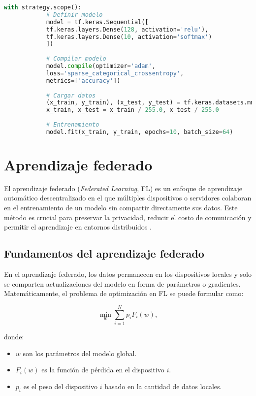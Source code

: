 \begin{itemize}
\begin{lstlisting}[language=Python, caption={Entrenamiento distribuido en TensorFlow}]
			with strategy.scope():
			# Definir modelo
			model = tf.keras.Sequential([
			tf.keras.layers.Dense(128, activation='relu'),
			tf.keras.layers.Dense(10, activation='softmax')
			])
			
			# Compilar modelo
			model.compile(optimizer='adam',
			loss='sparse_categorical_crossentropy',
			metrics=['accuracy'])
			
			# Cargar datos
			(x_train, y_train), (x_test, y_test) = tf.keras.datasets.mnist.load_data()
			x_train, x_test = x_train / 255.0, x_test / 255.0
			
			# Entrenamiento
			model.fit(x_train, y_train, epochs=10, batch_size=64)
		\end{lstlisting}
		\section{Aprendizaje federado}
		
		El aprendizaje federado (\textit{Federated Learning}, FL) es un enfoque de aprendizaje automático descentralizado en el que múltiples dispositivos o servidores colaboran en el entrenamiento de un modelo sin compartir directamente sus datos. Este método es crucial para preservar la privacidad, reducir el costo de comunicación y permitir el aprendizaje en entornos distribuidos \cite{mcmahan2017communication}.
		
		\subsection{Fundamentos del aprendizaje federado}
		
		En el aprendizaje federado, los datos permanecen en los dispositivos locales y solo se comparten actualizaciones del modelo en forma de parámetros o gradientes. Matemáticamente, el problema de optimización en FL se puede formular como:
		
		\begin{equation}
			\min_w \sum_{i=1}^{N} p_i F_i(w),
		\end{equation}
		
		donde:
		\begin{itemize}
			\item \( w \) son los parámetros del modelo global.
			\item \( F_i(w) \) es la función de pérdida en el dispositivo \( i \).
			\item \( p_i \) es el peso del dispositivo \( i \) basado en la cantidad de datos locales.
		\end{itemize}
		

\end{itemize}
